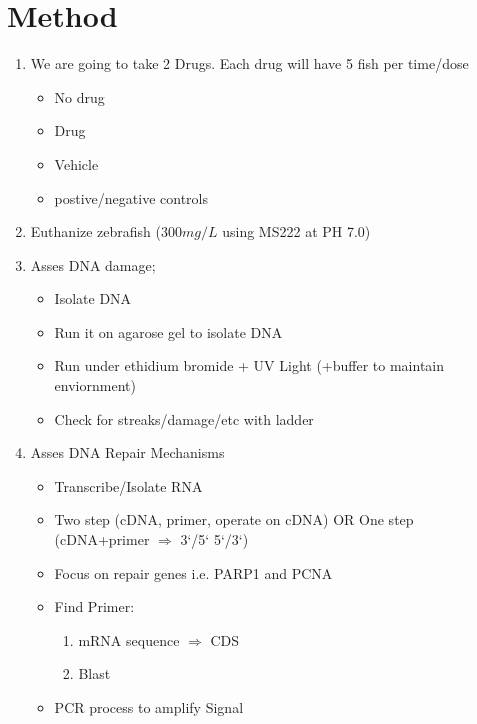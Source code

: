 \documentclass{scrartcl}
\begin{document}
\section{Method}
\label{sec:org4e856a0}
\begin{enumerate}
\item We are going to take 2 Drugs. Each drug will have 5 fish per time/dose
\begin{itemize}
\item No drug
\item Drug
\item Vehicle
\item postive/negative controls
\end{itemize}
\item Euthanize zebrafish (\(300mg/L\) using MS222 at PH 7.0)
\item Asses DNA damage;
\begin{itemize}
\item Isolate DNA
\item Run it on agarose gel to isolate DNA
\item Run under ethidium bromide + UV Light (+buffer to maintain enviornment)
\item Check for streaks/damage/etc with ladder
\end{itemize}
\item Asses DNA Repair Mechanisms
\begin{itemize}
\item Transcribe/Isolate RNA
\item Two step (cDNA, primer, operate on cDNA) OR One step (cDNA+primer \(\Rightarrow\) 3`/5` 5`/3`)
\item Focus on repair genes i.e. PARP1 and PCNA
\item Find Primer:
\begin{enumerate}
\item mRNA sequence \(\Rightarrow\) CDS
\item Blast
\end{enumerate}
\item PCR process to amplify Signal
\end{itemize}
\end{enumerate}
\end{document}
